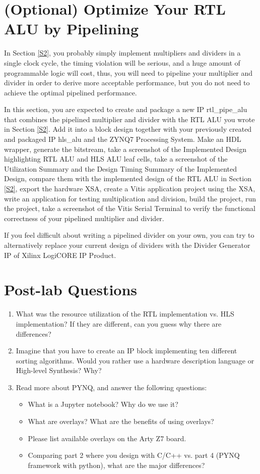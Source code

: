 \documentclass[a4paper,12pt,twoside]{article}
\begin{document}
\section{(Optional) Optimize Your RTL ALU by Pipelining}\label{Sopt1}
In Section \ref{S2}, you probably simply implement multipliers and dividers in a single clock cycle, the timing violation will be serious, and a huge amount of programmable logic will cost, thus, you will need to pipeline your multiplier and divider in order to derive more acceptable performance, but you do not need to achieve the optimal pipelined performance.

In this section, you are expected to create and package a new IP rtl\_pipe\_alu that combines the pipelined multiplier and divider with the RTL ALU you wrote in Section \ref{S2}. Add it into a block design together with your previously created and packaged IP hls\_alu and the ZYNQ7 Processing System. Make an HDL wrapper, generate the bitstream, take a screenshot of the Implemented Design highlighting RTL ALU and HLS ALU leaf cells, take a screenshot of the Utilization Summary and the Design Timing Summary of the Implemented Design, compare them with the implemented design of the RTL ALU in Section \ref{S2}, export the hardware XSA, create a Vitis application project using the XSA, write an application for testing multiplication and division, build the project, run the project, take a screenshot of the Vitis Serial Terminal to verify the functional correctness of your pipelined multiplier and divider.

If you feel difficult about writing a pipelined divider on your own, you can try to alternatively replace your current design of dividers with the Divider Generator IP of Xilinx LogiCORE IP Product.

\section{Post-lab Questions}\label{SPost}
\begin{enumerate}
    \item What was the resource utilization of the RTL implementation vs. HLS implementation? If they are different, can you guess why there are differences?
    \item Imagine that you have to create an IP block implementing ten different sorting algorithms. Would you rather use a hardware description language or High-level Synthesis? Why?
    \item Read more about PYNQ, and answer the following questions:
    \begin{itemize}
        \item What is a Jupyter notebook? Why do we use it?
        \item What are overlays? What are the benefits of using overlays?
        \item Please list available overlays on the Arty Z7 board.
        \item Comparing part 2 where you design with C/C++ vs. part 4 (PYNQ framework with python), what are the major differences?
    \end{itemize}
\end{enumerate}
\end{document}
